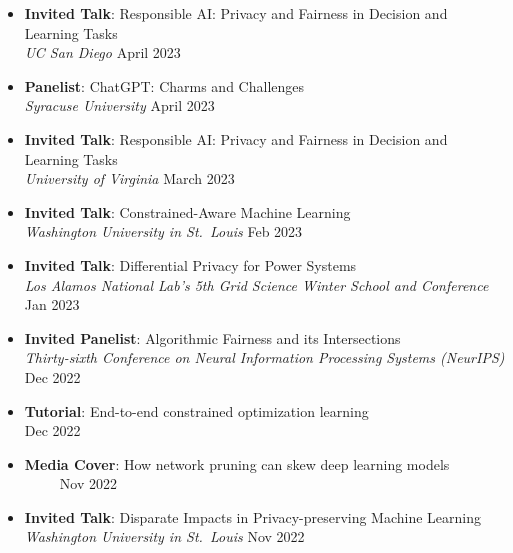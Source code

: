 \begin{itemize}
  \item {\bf Invited Talk}: {Responsible AI: Privacy and Fairness in Decision and Learning Tasks}\\
  {\em  UC San Diego}
  \hfill{April 2023}

  \item {\bf Panelist}: {ChatGPT: Charms and Challenges}\\
  {\em  Syracuse University}
  \hfill{April 2023}

  \item {\bf Invited Talk}: {Responsible AI: Privacy and Fairness in Decision and Learning Tasks}\\
  {\em  University of Virginia}
  \hfill{March 2023}

  \item {\bf Invited Talk}: {Constrained-Aware Machine Learning}\\
  {\em  Washington University in St.~Louis}
  \hfill{Feb 2023}

  \item {\bf Invited Talk}: {Differential Privacy for Power Systems}\\
  {\em  Los Alamos National Lab's 5th Grid Science Winter School and Conference}
  \hfill{Jan 2023}

  \item {\bf Invited Panelist}: {Algorithmic Fairness and its Intersections}\\
  {\em Thirty-sixth Conference on Neural Information Processing Systems (NeurIPS)}
  \hfill{Dec 2022}

  \item {\bf Tutorial}: {End-to-end constrained optimization learning}\\
  \hfill{Dec 2022}

  \item {\bf Media Cover}: 
  {How network pruning can skew deep learning models}\\ 
  ~
  ~
  ~
  \hfill {Nov 2022}

  \item {\bf Invited Talk}: {Disparate Impacts in Privacy-preserving Machine Learning}\\
  {\em Washington University in St.~Louis} \hfill{Nov 2022}


\end{itemize}
